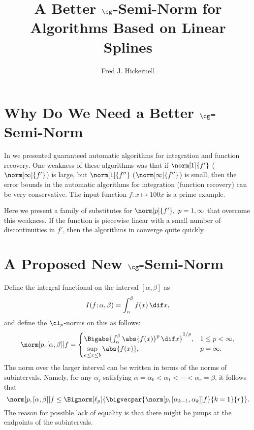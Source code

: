 \documentclass[final]{elsarticle}
\theoremstyle{definition}
\theoremstyle{remark}
\begin{document}
\begin{frontmatter}

\title{A Better $\cg$-Semi-Norm for Algorithms Based on Linear Splines}
\author{Fred J. Hickernell}
\address{Room E1-208, Department of Applied Mathematics, Illinois Institute of Technology,\\ 10 W.\ 32$^{\text{nd}}$ St., Chicago, IL 60616}
\begin{abstract}
\end{abstract}

\begin{keyword}


\end{keyword}
\end{frontmatter}

\section{Why Do We Need a Better $\cg$-Semi-Norm}
In \cite{HicEtal14b} we presented guaranteed automatic algorithms for integration and function recovery.  One weakness of these algorithms was that if $\norm[1]{f'}$ ($\norm[\infty]{f'}$) is large, but $\norm[1]{f''}$ ($\norm[\infty]{f''}$) is small, then the error bounds in the automatic algorithms for integration (function recovery) can be very conservative.  The input function $f:x\mapsto 100 x$ is a prime example.

Here we present a family of substitutes for $\norm[p]{f'}, \ p=1,\infty$ that overcome this weakness.  If the function is piecewise linear with a small number of discontinuities in $f'$, then the algorithms in \cite{HicEtal14b} converge quite quickly.

\section{A Proposed New $\cg$-Semi-Norm}
Define the integral functional on the interval $[\alpha,\beta]$ as 
\[
I(f;\alpha,\beta) = \int_\alpha^\beta f(x) \, \dif x,
\]
and define the $\cl_p$-norms on this as follows:
\[
\norm[p,{[\alpha,\beta]}]{f} = \begin{cases} \Bigabs{\int_\alpha^\beta \abs{f(x)}^p \, \dif x}^{1/p}, & 1 \le p < \infty,\\
\displaystyle \sup_{a \le x \le b}\abs{f(x)}, & p=\infty.
\end{cases}
\]
The norm over the larger interval can be written in terms of the norms of subintervals.  Namely, for any $\alpha_j$ satisfying $\alpha=\alpha_0 < \alpha_1 < \cdots < \alpha_r=\beta$, it follows that
\begin{equation}\label{subintnorm}
\norm[p,{[\alpha,\beta]}]{f} \le \Bignorm[\ell_p]{\bigvecpar{\norm[p,{[\alpha_{k-1},\alpha_k]}]{f}}{k=1}{r}}.
\end{equation}
The reason for possible lack of equality is that there might be jumps at the endpoints of the subintervals.  
\end{document}
